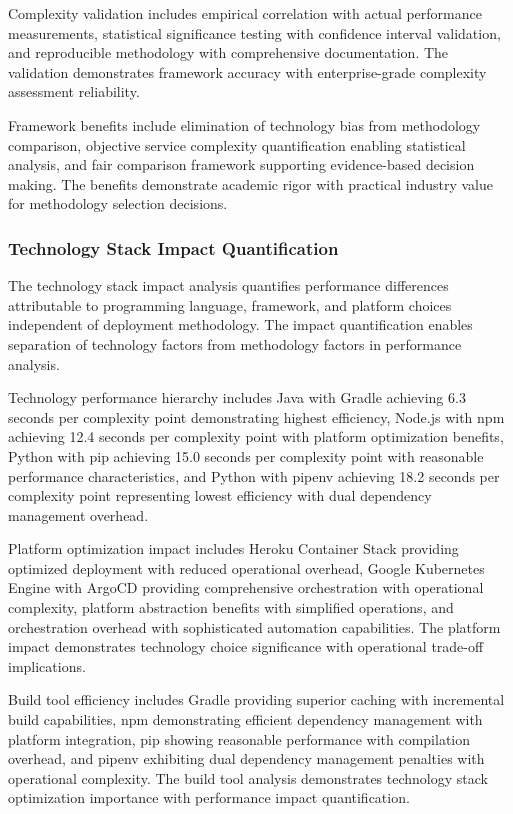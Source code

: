 Complexity validation includes empirical correlation with actual performance measurements, statistical significance testing with confidence interval validation, and reproducible methodology with comprehensive documentation. The validation demonstrates framework accuracy with enterprise-grade complexity assessment reliability.

Framework benefits include elimination of technology bias from methodology comparison, objective service complexity quantification enabling statistical analysis, and fair comparison framework supporting evidence-based decision making. The benefits demonstrate academic rigor with practical industry value for methodology selection decisions.

\subsubsection{Technology Stack Impact Quantification}

The technology stack impact analysis quantifies performance differences attributable to programming language, framework, and platform choices independent of deployment methodology. The impact quantification enables separation of technology factors from methodology factors in performance analysis.

Technology performance hierarchy includes Java with Gradle achieving 6.3 seconds per complexity point demonstrating highest efficiency, Node.js with npm achieving 12.4 seconds per complexity point with platform optimization benefits, Python with pip achieving 15.0 seconds per complexity point with reasonable performance characteristics, and Python with pipenv achieving 18.2 seconds per complexity point representing lowest efficiency with dual dependency management overhead.

Platform optimization impact includes Heroku Container Stack providing optimized deployment with reduced operational overhead, Google Kubernetes Engine with ArgoCD providing comprehensive orchestration with operational complexity, platform abstraction benefits with simplified operations, and orchestration overhead with sophisticated automation capabilities. The platform impact demonstrates technology choice significance with operational trade-off implications.

Build tool efficiency includes Gradle providing superior caching with incremental build capabilities, npm demonstrating efficient dependency management with platform integration, pip showing reasonable performance with compilation overhead, and pipenv exhibiting dual dependency management penalties with operational complexity. The build tool analysis demonstrates technology stack optimization importance with performance impact quantification.

